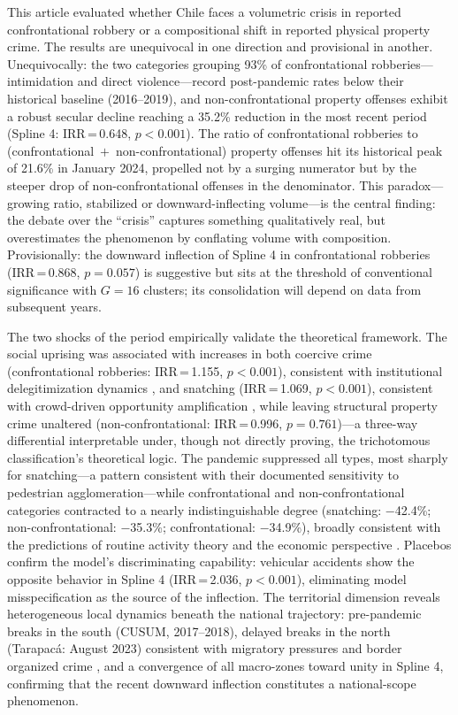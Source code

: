 \documentclass[pdflatex,sn-basic]{sn-jnl}
\begin{document}
This article evaluated whether Chile faces a volumetric crisis in reported confrontational robbery or a compositional shift in reported physical property crime. The results are unequivocal in one direction and provisional in another. Unequivocally: the two categories grouping 93\% of confrontational robberies---intimidation and direct violence---record post-pandemic rates below their historical baseline (2016--2019), and non-confrontational property offenses exhibit a robust secular decline reaching a 35.2\% reduction in the most recent period (Spline 4: IRR\,=\,0.648, $p<0.001$). The ratio of confrontational robberies to (confrontational~$+$~non-confrontational) property offenses hit its historical peak of 21.6\% in January 2024, propelled not by a surging numerator but by the steeper drop of non-confrontational offenses in the denominator. This paradox---growing ratio, stabilized or downward-inflecting volume---is the central finding: the debate over the ``crisis'' captures something qualitatively real, but overestimates the phenomenon by conflating volume with composition. Provisionally: the downward inflection of Spline 4 in confrontational robberies (IRR\,=\,0.868, $p=0.057$) is suggestive but sits at the threshold of conventional significance with $G=16$ clusters; its consolidation will depend on data from subsequent years.

The two shocks of the period empirically validate the theoretical framework. The social uprising was associated with increases in both coercive crime (confrontational robberies: IRR\,=\,1.155, $p<0.001$), consistent with institutional delegitimization dynamics \citep{tyler2006,rosenfeld2021}, and snatching (IRR\,=\,1.069, $p<0.001$), consistent with crowd-driven opportunity amplification \citep{cohen1979}, while leaving structural property crime unaltered (non-confrontational: IRR\,=\,0.996, $p=0.761$)---a three-way differential interpretable under, though not directly proving, the trichotomous classification's theoretical logic. The pandemic suppressed all types, most sharply for snatching---a pattern consistent with their documented sensitivity to pedestrian agglomeration---while confrontational and non-confrontational categories contracted to a nearly indistinguishable degree (snatching: $-$42.4\%; non-confrontational: $-$35.3\%; confrontational: $-$34.9\%), broadly consistent with the predictions of routine activity theory \citep{cohen1979} and the economic perspective \citep{becker1968}. Placebos confirm the model's discriminating capability: vehicular accidents show the opposite behavior in Spline 4 (IRR\,=\,2.036, $p<0.001$), eliminating model misspecification as the source of the inflection. The territorial dimension reveals heterogeneous local dynamics beneath the national trajectory: pre-pandemic breaks in the south (CUSUM, 2017--2018), delayed breaks in the north (Tarapac\'a: August 2023) consistent with migratory pressures and border organized crime \citep{bravo2024,crespo2023}, and a convergence of all macro-zones toward unity in Spline 4, confirming that the recent downward inflection constitutes a national-scope phenomenon.
\end{document}
